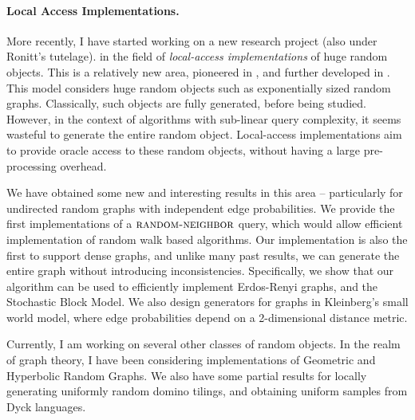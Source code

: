 \paragraph{Local Access Implementations.}
More recently, I have started working on a new research project (also under Ronitt's tutelage).
in the field of \emph{local-access implementations} of huge random objects.
This is a relatively new area, pioneered in \cite{huge, huge_old}, and further developed in \cite{sparse, reut}.
This model considers huge random objects such as exponentially sized random graphs.
Classically, such objects are fully generated, before being studied.
However, in the context of algorithms with sub-linear query complexity, it seems wasteful to generate the entire random object.
Local-access implementations aim to provide oracle access to these random objects,
without having a large pre-processing overhead.

We have obtained some new and interesting results in this area --
particularly for undirected random graphs with independent edge probabilities.
We provide the first implementations of a $\textsc{random-neighbor}$ query,
which would allow efficient implementation of random walk based algorithms.
Our implementation is also the first to support dense graphs,
and unlike many past results, we can generate the entire graph without introducing inconsistencies.
Specifically, we show that our algorithm can be used to efficiently implement Erdos-Renyi graphs, and the Stochastic Block Model.
We also design generators for graphs in Kleinberg's small world model,
where edge probabilities depend on a 2-dimensional distance metric.

Currently, I am working on several other classes of random objects.
In the realm of graph theory, I have been considering implementations of Geometric and Hyperbolic Random Graphs.
We also have some partial results for locally generating uniformly random domino tilings,
and obtaining uniform samples from Dyck languages.

